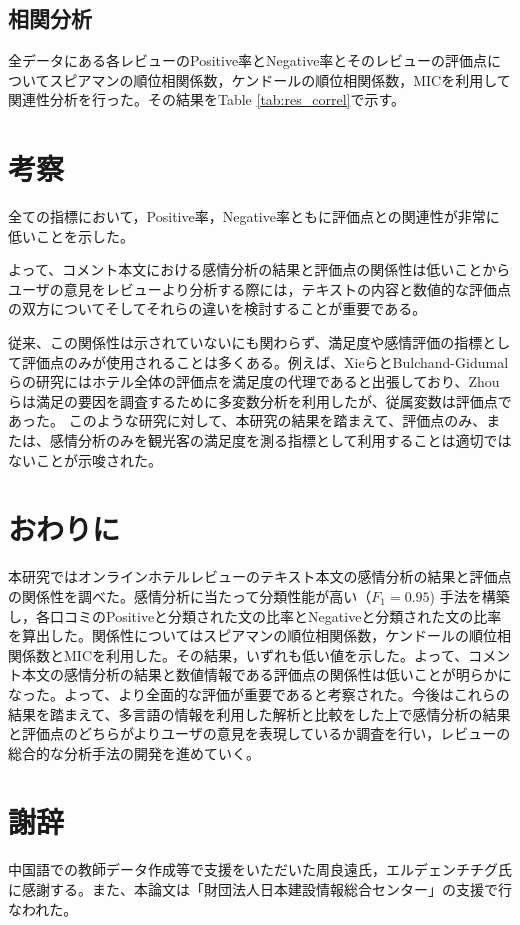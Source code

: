 \documentclass[review]{elsarticle}
\begin{document}
\begin{CJK}{UTF8}{min}
\subsection{相関分析}\label{res_correls}

全データにある各レビューのPositive率とNegative率とそのレビューの評価点についてスピアマンの順位相関係数，ケンドールの順位相関係数，MICを利用して関連性分析を行った。その結果をTable \ref{tab:res_correl}で示す。

\section{考察}\label{discussion}

全ての指標において，Positive率，Negative率ともに評価点との関連性が非常に低いことを示した。

よって、コメント本文における感情分析の結果と評価点の関係性は低いことからユーザの意見をレビューより分析する際には，テキストの内容と数値的な評価点の双方についてそしてそれらの違いを検討することが重要である。

従来、この関係性は示されていないにも関わらず、満足度や感情評価の指標として評価点のみが使用されることは多くある。例えば、XieらとBulchand-Gidumalらの研究にはホテル全体の評価点を満足度の代理であると出張しており\cite[][]{XIE20141, BULCHANDGIDUMAL201344}、Zhouらは満足の要因を調査するために多変数分析を利用したが、従属変数は評価点であった\cite[][]{ZHOU20141}。
このような研究に対して、本研究の結果を踏まえて、評価点のみ、または、感情分析のみを観光客の満足度を測る指標として利用することは適切ではないことが示唆された。

\section{おわりに}\label{conclusion}

本研究ではオンラインホテルレビューのテキスト本文の感情分析の結果と評価点の関係性を調べた。感情分析に当たって分類性能が高い（\(F_1 = 0.95\)) 手法を構築し，各口コミのPositiveと分類された文の比率とNegativeと分類された文の比率を算出した。関係性についてはスピアマンの順位相関係数，ケンドールの順位相関係数とMICを利用した。その結果，いずれも低い値を示した。よって、コメント本文の感情分析の結果と数値情報である評価点の関係性は低いことが明らかになった。よって、より全面的な評価が重要であると考察された。今後はこれらの結果を踏まえて、多言語の情報を利用した解析と比較をした上で感情分析の結果と評価点のどちらがよりユーザの意見を表現しているか調査を行い，レビューの総合的な分析手法の開発を進めていく。

\section*{謝辞}\label{acknowledgements}

中国語での教師データ作成等で支援をいただいた周良遠氏，エルデェンチチグ氏に感謝する。また、本論文は「財団法人日本建設情報総合センター」の支援で行なわれた。

\clearpage



\end{CJK}
\end{document}
